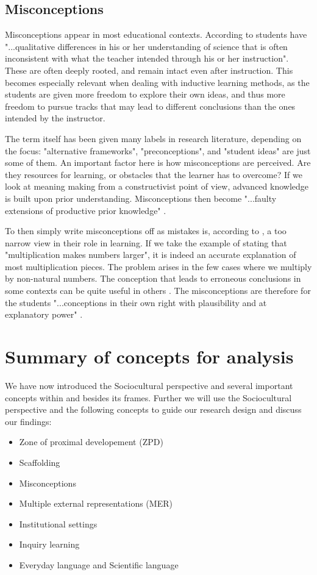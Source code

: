 \subsection{Misconceptions}
Misconceptions appear in most educational contexts. According to \citet{gomez2008elementary} students have "...qualitative differences in his or her understanding of science that is often inconsistent with what the teacher intended through his or her instruction". These are often deeply rooted, and remain intact even after instruction. This becomes especially relevant when dealing with inductive learning methods, as the students are given more freedom to explore their own ideas, and thus more freedom to pursue tracks that may lead to different conclusions than the ones intended by the instructor.

The term itself has been given many labels in research literature, depending on the focus: "alternative frameworks", "preconceptions", and "student ideas" are just some of them. An important factor here is how misconceptions are perceived. Are they resources for learning, or obstacles that the learner has to overcome? If we look at meaning making from a constructivist point of view, advanced knowledge is built upon prior understanding. Misconceptions then become "...faulty extensions of productive prior knowledge" \citep{smith1994misconceptions}.

To then simply write misconceptions off as mistakes is, according to \citet{smith1994misconceptions}, a too narrow view in their role in learning. If we take the example of stating that "multiplication makes numbers larger", it is indeed an accurate explanation of most multiplication pieces. The problem arises in the few cases where we multiply by non-natural numbers. The conception that leads to erroneous conclusions in some contexts can be quite useful in others \citep{smith1994misconceptions}. The misconceptions are therefore for the students "...conceptions in their own right with plausibility and at explanatory power" \citetext{\citealp{smith1994misconceptions}, referenced in \citealp{larkin2012misconceptions}}. 


\section{Summary of concepts for analysis}
We have now introduced the Sociocultural perspective and several important concepts within and besides its frames. Further we will use the Sociocultural perspective and the following concepts to guide our research design and discuss our findings:

\begin{itemize}
\item{Zone of proximal developement (ZPD)}
\item{Scaffolding}
\item{Misconceptions}
\item{Multiple external representations (MER)}
\item{Institutional settings}
\item{Inquiry learning}
\item{Everyday language and Scientific language}

\end{itemize}